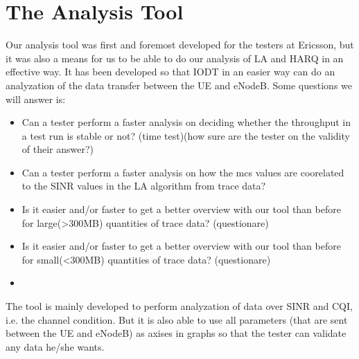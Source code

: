 \documentclass[cropmarks, frame, english]{idamasterthesis}
\begin{document}
\chapter{The Analysis Tool}
Our analysis tool was first and foremost developed for the testers at Ericsson, but it was also a means for us to be able to do our analysis of LA and HARQ in an effective way. It has been developed so that IODT in an easier way can do an analyzation of the data transfer between the UE and eNodeB. Some questions we will answer is:
\begin{itemize}
	\item Can a tester perform a faster analysis on deciding whether the throughput in a test run is stable or not? (time test)(how sure are the tester on the validity of their answer?)
	\item Can a tester perform a faster analysis on how the mcs values are coorelated to the SINR values in the LA algorithm from trace data?
	\item Is it easier and/or faster to get a better overview with our tool than before for large(>300MB) quantities of trace data? (questionare)
	\item Is it easier and/or faster to get a better overview with our tool than before for small(<300MB) quantities of trace data? (questionare)
	\item 
\end{itemize} 


The tool is mainly developed to perform analyzation of data over SINR and CQI, i.e. the channel condition. But it is also able to use all parameters (that are sent between the UE and eNodeB) as axises in graphs so that the tester can validate any data he/she wants.
\end{document}
